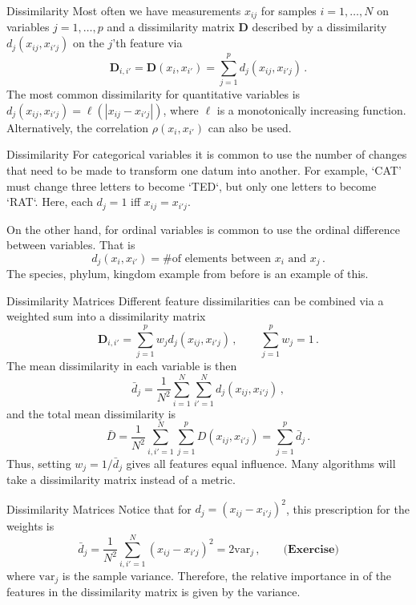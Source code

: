\documentclass[10pt, table, dvipsnames,xcdraw, handout]{beamer}
\newcommand{\bfD}{\ensuremath{\mathbf{D}}}
\begin{document}
\begin{frame}[fragile]{Dissimilarity}
Most often we have measurements $x_{ij}$ for samples $i = 1,\ldots, N$ on variables $j=1,\ldots, p$ and a dissimilarity matrix $\bfD$ described by a dissimilarity $d_j(x_{ij},x_{i'j})$ on the $j$'th feature via
$$
\bfD_{i,i'} = \bfD(x_i,x_{i'}) = \sum_{j=1}^p d_j(x_{ij},x_{i'j})\,.
$$\pause
The most common dissimilarity for quantitative variables is $d_j(x_{ij},x_{i'j}) = \ell (|x_{ij}-x_{i'j}|)$, where $\ell$ is a monotonically increasing function. \pause Alternatively, the correlation $\rho(x_i, x_{i'})$ can also be used.
\end{frame}


\begin{frame}[fragile]{Dissimilarity}
For categorical variables it is common to use the number of changes that need to be made to transform one datum into another. For example, `CAT' must change three letters to become `TED`, but only one letters to become `RAT`. \pause Here, each $d_j = 1$ iff $x_{ij}=x_{i'j}$. \pause

On the other hand, for ordinal variables is common to use the ordinal difference between variables. That is 
$$
d_j(x_i,x_{i'}) =  \# \text{of elements between $x_i$ and $x_j$}\,.
$$
The species, phylum, kingdom example from before is an example of this. 
\end{frame}



\begin{frame}[fragile]{Dissimilarity Matrices}
Different feature dissimilarities can be combined via a weighted sum into a dissimilarity matrix
$$
\bfD_{i,i'} =  \sum_{j=1}^p w_j d_j(x_{ij},x_{i'j})\,,\hspace{2em} \sum_{j=1}^p w_j = 1\,.
$$\pause
The mean dissimilarity in each variable is then 
$$
\bar d_j  = \frac{1}{N^2}\sum_{i=1}^N\sum_{i'=1}^N  d_j(x_{ij},x_{i'j})\,,
$$
and the total mean dissimilarity is 
$$
\bar D  = \frac{1}{N^2}\sum_{i,i'=1}^N\sum_{j=1}^p D(x_{ij},x_{i'j}) = \sum_{j=1}^p \bar d_j\,.
$$\pause
Thus, setting $w_j = 1/\bar d_j$ gives all features equal influence. Many algorithms will take a dissimilarity matrix instead of a metric. 
\end{frame}




\begin{frame}[fragile]{Dissimilarity Matrices}
Notice that for $d_j = (x_{ij} - x_{i'j})^2$, this prescription for the weights is
$$
\bar d_j = \frac{1}{N^2}\sum_{i,i'=1}^N (x_{ij} - x_{i'j})^2 = 2 \text{var}_j\,,\hspace{2em} \textbf{(Exercise)}
$$
where $\text{var}_j$ is the sample variance. \pause Therefore, the relative importance in of the features in the dissimilarity matrix is given by the variance. 
\end{frame}
\end{document}
